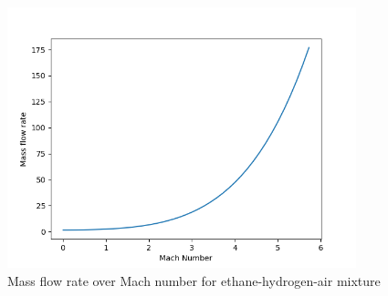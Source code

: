 \documentclass[a4paper,11pt]{article}
\begin{document}
	\begin{figure}[H]
		\centering
		\includegraphics[width=0.9\textwidth]{Wodor(0.5mol)_Etan(1mol)_pow/Mass_flow_rate_over_Mach.png}
       		\caption{Mass flow rate over Mach number for ethane-hydrogen-air mixture}
	\end{figure}
\end{document}
